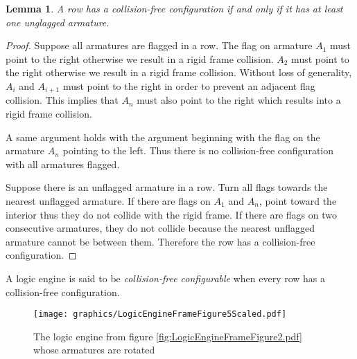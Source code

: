 \documentclass[10pt]{CSUNthesis}
\theoremstyle{plain}%
\newtheorem{lem}{Lemma}
\theoremstyle{definition}
\theoremstyle{remark}
\begin{document}
\begin{lem}\label{lem:logicEngine1}A row has a collision-free configuration if and only if it has 
at least one unglagged armature. \end{lem}
\begin{proof}

Suppose all armatures are flagged in a row.  The flag on armature $A_1$ must point to the 
right otherwise we result in a rigid frame collision.  $A_2$ must point to the right otherwise 
we result in a rigid frame collision.  Without loss of generality, $A_i$ and $A_{i+1}$ must 
point to the right in order to prevent an adjacent flag collision.  This implies that $A_n$ 
must also point to the right which results into a rigid frame collision.

A same argument holds with the argument beginning with the flag 
on the armature $A_n$ pointing to the left.  Thus there is no collision-free configuration with 
all armatures flagged.


Suppose there is an unflagged armature in a row.  Turn all flags towards the nearest unflagged 
armature.  If there are flags on $A_1$ and $A_n$, point toward the interior thus they do not 
collide with the rigid frame.  If there are flags on two consecutive armatures, they do not collide 
because the nearest unflagged armature cannot be between them.  Therefore the row has a 
collision-free configuration.
\end{proof}

A logic engine is said to be \textit{collision-free configurable} when every row has a collision-free configuration.
\begin{figure}[!ht]
\begin{center}
\texttt{[image: graphics/LogicEngineFrameFigure5Scaled.pdf]}
\caption{The logic engine from figure \ref{fig:LogicEngineFrameFigure2.pdf} whose armatures are rotated}\label{fig:LogicEngineFrameFigure5.pdf}
\end{center}
\end{figure}
\end{document}
